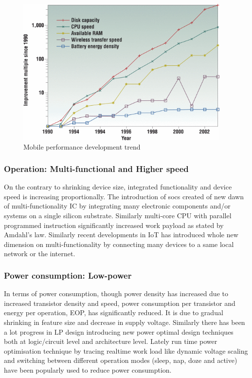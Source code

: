 \documentclass[12pt,a4paper,UKenglish]{report}
\begin{document}
\begin{figure}[!htbp] %
   \centering
   \includegraphics[width=0.95\textwidth]{img/comp_tech_batt.png}
   \caption{Mobile performance development trend \cite{mobile_performance}}
   \label{fig:comp_tech_batt}
\end{figure}

\subsubsection{Operation: Multi-functional and Higher speed}

On the contrary to shrinking device size, integrated functionality and device speed is increasing proportionally. 
The introduction of \acrshort{soc}s created of new dawn of multi-functionality IC by integrating many electronic components 
and/or systems on a single silicon substrate. Similarly multi-core CPU with parallel programmed instruction  
significantly increased work payload as stated by Amdahl's law. Similarly recent developments in IoT has 
introduced whole new dimension on multi-functionality by connecting many devices to a same local network or 
the internet\cite{iot_intro}. \\

\subsubsection{Power consumption: Low-power}

In terms of power consumption, though power density has increased due to increased transistor density and speed, 
power consumption per transistor and energy per operation, EOP, has significantly reduced. It is due to gradual 
shrinking in feature size and decrease in supply voltage. Similarly there has been a lot progress in LP design 
introducing new power optimal design techniques both at logic/circuit level and architecture level. Lately run 
time power optimisation technique by tracing realtime work load like dynamic voltage scaling and switching 
between different operation modes (sleep, nap, doze and active) have been popularly used to reduce power 
consumption\cite{rabaey_2009}. \\
\end{document}
